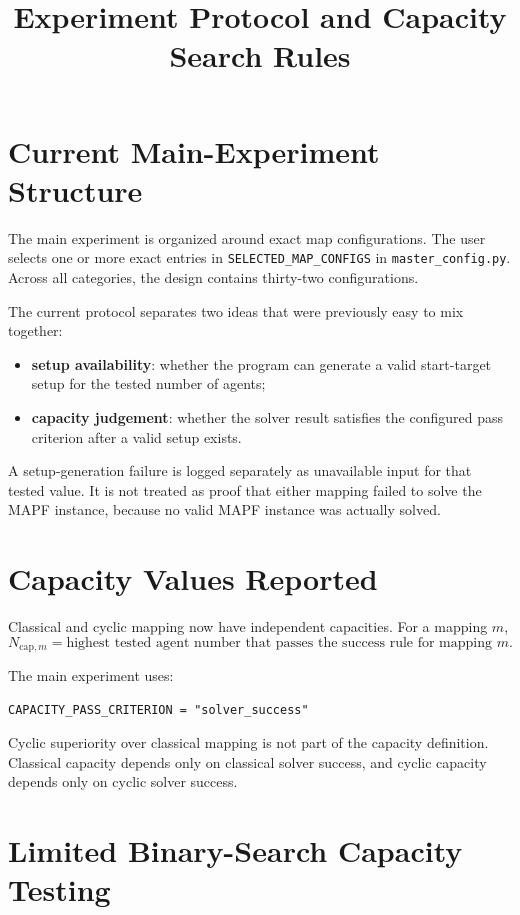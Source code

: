 \documentclass[11pt]{article}
\title{Experiment Protocol and Capacity Search Rules}
\author{}
\date{}
\begin{document}
\maketitle

\section{Current Main-Experiment Structure}

The main experiment is organized around exact map configurations. The user selects one or more exact entries in \texttt{SELECTED\_MAP\_CONFIGS} in \texttt{master\_config.py}. Across all categories, the design contains thirty-two configurations.

The current protocol separates two ideas that were previously easy to mix together:

\begin{itemize}[leftmargin=2em]
    \item \textbf{setup availability}: whether the program can generate a valid start-target setup for the tested number of agents;
    \item \textbf{capacity judgement}: whether the solver result satisfies the configured pass criterion after a valid setup exists.
\end{itemize}

A setup-generation failure is logged separately as unavailable input for that tested value. It is not treated as proof that either mapping failed to solve the MAPF instance, because no valid MAPF instance was actually solved.

\section{Capacity Values Reported}

Classical and cyclic mapping now have independent capacities. For a mapping $m$,
\[
N_{\mathrm{cap},m} = \text{highest tested agent number that passes the success rule for mapping } m.
\]

The main experiment uses:
\begin{lstlisting}
CAPACITY_PASS_CRITERION = "solver_success"
\end{lstlisting}

Cyclic superiority over classical mapping is not part of the capacity definition. Classical capacity depends only on classical solver success, and cyclic capacity depends only on cyclic solver success.

\section{Limited Binary-Search Capacity Testing}
\end{document}
